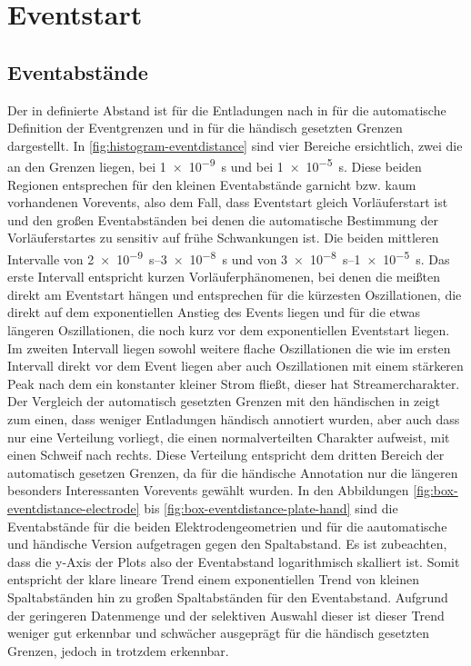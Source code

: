 \chapter{Eventstart}
\label{chap:eventstart}

\section{Eventabstände}

Der in  definierte Abstand ist für die Entladungen nach  in  für die automatische Definition der Eventgrenzen und in  für die händisch gesetzten Grenzen dargestellt. In \ref{fig:histogram-eventdistance} sind vier Bereiche ersichtlich, zwei die an den Grenzen liegen, bei \SI{1e-9}{\second} und bei \SI{1e-5}{\second}. Diese beiden Regionen entsprechen für den kleinen Eventabstände garnicht bzw. kaum vorhandenen Vorevents, also dem Fall, dass Eventstart gleich Vorläuferstart ist und den großen Eventabständen bei denen die automatische Bestimmung der Vorläuferstartes zu sensitiv auf frühe Schwankungen ist. Die beiden mittleren Intervalle von \SIrange{2e-9}{3e-8}{\second} und von \SIrange{3e-8}{1e-5}{\second}. Das erste Intervall entspricht kurzen Vorläuferphänomenen, bei denen die meißten direkt am Eventstart hängen und entsprechen für die kürzesten Oszillationen, die direkt auf dem exponentiellen Anstieg des Events liegen und für die etwas längeren Oszillationen, die noch kurz vor dem exponentiellen Eventstart liegen. Im zweiten Intervall liegen sowohl weitere flache Oszillationen die wie im ersten Intervall direkt vor dem Event liegen aber auch Oszillationen mit einem stärkeren Peak nach dem ein konstanter kleiner Strom fließt, dieser hat Streamercharakter. Der Vergleich der automatisch gesetzten Grenzen mit den händischen in  zeigt zum einen, dass weniger Entladungen händisch annotiert wurden, aber auch dass nur eine Verteilung vorliegt, die einen normalverteilten Charakter aufweist, mit einen Schweif nach rechts. Diese Verteilung entspricht dem dritten Bereich der automatisch gesetzen Grenzen, da für die händische Annotation nur die längeren besonders Interessanten Vorevents gewählt wurden. In den Abbildungen \ref{fig:box-eventdistance-electrode} bis \ref{fig:box-eventdistance-plate-hand} sind die Eventabstände für die beiden Elektrodengeometrien und für die aautomatische und händische Version aufgetragen gegen den Spaltabstand. Es ist zubeachten, dass die y-Axis der Plots also der Eventabstand logarithmisch skalliert ist. Somit entspricht der klare lineare Trend einem exponentiellen Trend von kleinen Spaltabständen hin zu großen Spaltabständen für den Eventabstand. Aufgrund der geringeren Datenmenge und der selektiven Auswahl dieser ist dieser Trend weniger gut erkennbar und schwächer ausgeprägt für die händisch gesetzten Grenzen, jedoch in  trotzdem erkennbar.







